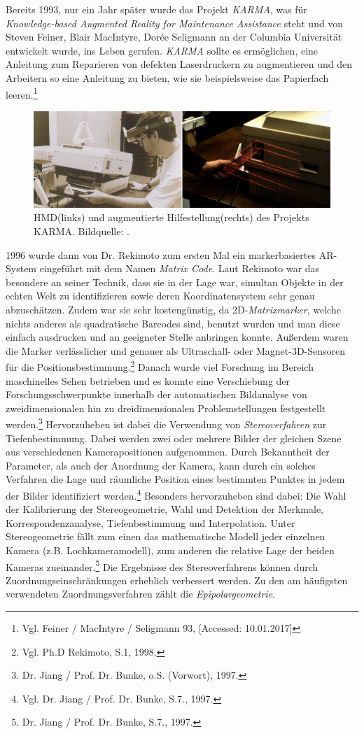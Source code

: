 Bereits 1993, nur ein Jahr später wurde das Projekt \textit{KARMA}, was für \textit{Knowledge-based Augmented Reality for Maintenance Assistance} steht und von Steven Feiner, Blair MacIntyre, Dorée Seligmann an der Columbia Universität entwickelt wurde, ins Leben gerufen. \textit{KARMA} sollte es ermöglichen, eine Anleitung zum Reparieren von defekten Laserdruckern zu augmentieren und den Arbeitern so eine Anleitung zu bieten, wie sie beispielsweise das Papierfach leeren.\footnote{ Vgl. Feiner / MacIntyre / Seligmann 93, [Accessed: 10.01.2017]}
\begin{figure}[ht]
	\centering
	\includegraphics[width=1.\textwidth]{figuren/ar-karma}
	\caption{HMD(links) und augmentierte Hilfestellung(rechts) des Projekts \frqq KARMA\flqq. Bildquelle: \cite{karma}.}
	\label{fig:karma_hmd}
\end{figure}
1996 wurde dann von Dr. Rekimoto zum ersten Mal ein markerbasiertes AR-System eingeführt mit dem Namen \textit{Matrix Code}. Laut Rekimoto war das besondere an seiner Technik, dass sie in der Lage war, simultan Objekte in der echten Welt zu identifizieren sowie deren Koordinatensystem sehr genau abzuschätzen. Zudem war sie sehr kostengünstig, da 2D-\textit{Matrixmarker}, welche nichts anderes als quadratische Barcodes sind, benutzt wurden und man diese einfach ausdrucken und an geeigneter Stelle anbringen konnte. Außerdem waren die Marker verlässlicher und genauer als Ultraschall- oder Magnet-3D-Sensoren für die Positionsbestimmung.\footnote{ Vgl. Ph.D Rekimoto, S.1, 1998.} Danach wurde viel Forschung im Bereich maschinelles Sehen  betrieben und es konnte eine \frqq Verschiebung der Forschungsschwerpunkte innerhalb der automatischen Bildanalyse von zweidimensionalen hin zu dreidimensionalen Problemstellungen festgestellt werden\flqq.\footnote{ Dr. Jiang / Prof. Dr. Bunke, o.S. (Vorwort), 1997.} Hervorzuheben ist dabei die Verwendung von \textit{Stereoverfahren} zur Tiefenbestimmung. Dabei werden zwei oder mehrere Bilder der gleichen Szene aus verschiedenen Kamerapositionen aufgenommen. Durch Bekanntheit der Parameter, als auch der Anordnung der Kamera, kann durch ein solches Verfahren die Lage und räumliche Position eines bestimmten Punktes in jedem der Bilder identifiziert werden.\footnote{ Vgl. Dr. Jiang / Prof. Dr. Bunke, S.7., 1997.} Besonders hervorzuheben sind dabei: \frqq Die Wahl der Kalibrierung der Stereogeometrie, Wahl und Detektion der Merkmale, Korrespondenzanalyse, Tiefenbestimmung und Interpolation. Unter Stereogeometrie fällt zum einen das mathematische Modell jeder einzelnen Kamera (z.B. Lochkameramodell), zum anderen die relative Lage der beiden Kameras zueinander\flqq.\footnote{ Dr. Jiang / Prof. Dr. Bunke, S.7., 1997.} Die Ergebnisse des Stereoverfahrens können durch Zuordnungseinschränkungen erheblich verbessert werden. Zu den am häufigsten verwendeten Zuordnungsverfahren zählt die \textit{Epipolargeometrie}.
